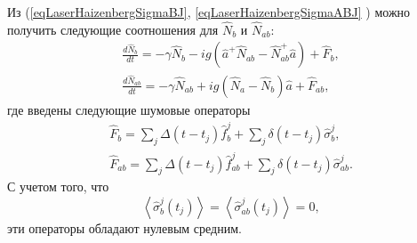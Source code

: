Из (\ref{eqLaserHaizenbergSigmaBJ},
\ref{eqLaserHaizenbergSigmaABJ} ) можно получить следующие соотношения для
$\hat{N}_b$ и $\hat{N}_{ab}$:
\begin{eqnarray}
\frac{d \hat{N}_b}{d t} = 
- \gamma \hat{N}_{b} -
i g 
 \left(
\hat{a}^{+}\hat{N}_{ab} -
\hat{N}_{ab}^{+}\hat{a}
\right) + \hat{F}_{b},
\nonumber \\
\frac{d \hat{N}_{ab}}{d t} = 
- \gamma \hat{N}_{ab} 
+ i g 
\left(\hat{N}_{a} -
\hat{N}_{b}\right)\hat{a} 
 + \hat{F}_{ab},
\label{eqLaserHaizenberNB_AB}
\end{eqnarray}
где введены следующие шумовые операторы
\begin{eqnarray}
\hat{F}_{b} = \sum_j\Delta\left(t - t_j\right)\hat{f}^{j}_{b} + \sum_j
\delta\left(t - t_j\right)\hat{\sigma}^{j}_{b}, 
\nonumber \\
\hat{F}_{ab} = \sum_j\Delta\left(t - t_j\right)\hat{f}^{j}_{ab} +
\sum_j \delta\left(t - t_j\right)\hat{\sigma}^{j}_{ab}. 
\label{eqLaserHaizenbergFB_AB}
\end{eqnarray}
С учетом того, что
\[
\left<\hat{\sigma}^{j}_{b}\left(t_j\right)\right> = 
\left<\hat{\sigma}^{j}_{ab}\left(t_j\right)\right> = 0,
\]
эти операторы обладают нулевым средним. 

